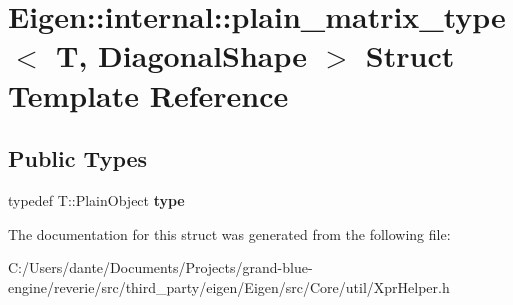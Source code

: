 \hypertarget{struct_eigen_1_1internal_1_1plain__matrix__type_3_01_t_00_01_diagonal_shape_01_4}{}\section{Eigen\+::internal\+::plain\+\_\+matrix\+\_\+type$<$ T, Diagonal\+Shape $>$ Struct Template Reference}
\label{struct_eigen_1_1internal_1_1plain__matrix__type_3_01_t_00_01_diagonal_shape_01_4}
\subsection*{Public Types}
\begin{DoxyCompactItemize}
\item 
\mbox{\label{struct_eigen_1_1internal_1_1plain__matrix__type_3_01_t_00_01_diagonal_shape_01_4_a92afd71e20eff907c95e7262e42a9b71}} 
typedef T\+::\+Plain\+Object {\bfseries type}
\end{DoxyCompactItemize}


The documentation for this struct was generated from the following file\+:\begin{DoxyCompactItemize}
\item 
C\+:/\+Users/dante/\+Documents/\+Projects/grand-\/blue-\/engine/reverie/src/third\+\_\+party/eigen/\+Eigen/src/\+Core/util/Xpr\+Helper.\+h\end{DoxyCompactItemize}
